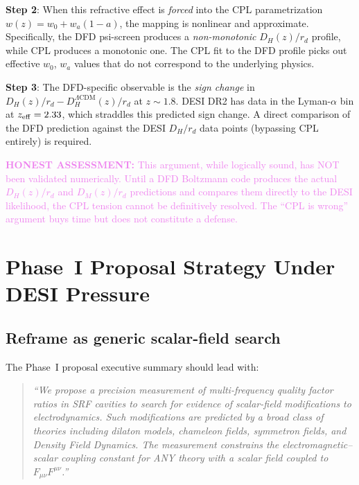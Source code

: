 \documentclass[11pt]{article}
\newcommand{\honest}[1]{\textcolor{violet}{\textbf{HONEST ASSESSMENT:} #1}}
\theoremstyle{definition}
\theoremstyle{remark}
\begin{document}
\textbf{Step 2}: When this refractive effect is \emph{forced} into the
CPL parametrization $w(z) = w_0 + w_a(1-a)$, the mapping is nonlinear
and approximate. Specifically, the DFD psi-screen produces a
\emph{non-monotonic} $D_H(z)/r_d$ profile, while CPL produces a
monotonic one. The CPL fit to the DFD profile picks out effective
$w_0$, $w_a$ values that do not correspond to the underlying physics.

\textbf{Step 3}: The DFD-specific observable is the \emph{sign change}
in $D_H(z)/r_d - D_H^{\Lambda\text{CDM}}(z)/r_d$ at $z \sim 1.8$.
DESI DR2 has data in the Lyman-$\alpha$ bin at $z_{\rm eff} = 2.33$,
which straddles this predicted sign change. A direct comparison of the
DFD prediction against the DESI $D_H/r_d$ data points (bypassing
CPL entirely) is required.

\honest{This argument, while logically sound, has NOT been validated
numerically. Until a DFD Boltzmann code produces the actual $D_H(z)/r_d$
and $D_M(z)/r_d$ predictions and compares them directly to the DESI
likelihood, the CPL tension cannot be definitively resolved. The
``CPL is wrong'' argument buys time but does not constitute a defense.}


\section{Phase~I Proposal Strategy Under DESI Pressure}
\label{sec:desi_strategy}

\subsection{Reframe as generic scalar-field search}

The Phase~I proposal executive summary should lead with:

\begin{quote}
\textit{``We propose a precision measurement of multi-frequency quality
factor ratios in SRF cavities to search for evidence of scalar-field
modifications to electrodynamics. Such modifications are predicted by a
broad class of theories including dilaton models, chameleon fields,
symmetron fields, and Density Field Dynamics. The measurement constrains
the electromagnetic--scalar coupling constant for ANY theory with a
scalar field coupled to $F_{\mu\nu}F^{\mu\nu}$.''}
\end{quote}
\end{document}
